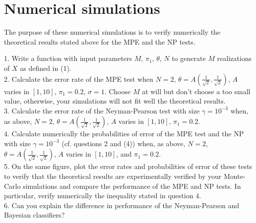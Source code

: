 \documentclass[12pt,a4paper]{article}
\begin{document}
\section{Numerical simulations}
The purpose of these numerical simulations is to verify numerically the theoretical results stated above for the MPE and the NP tests.\\
\begin{tquesto}{}{}
	1. Write a function with input parameters $M$, $\pi_1$, $\theta$, $N$ to generate $M$ realizations of $X$ as defined in (1).\\
	2. Calculate the error rate of the MPE test when $N = 2$, $\theta = A\left(\frac{1}{\sqrt{2}},\frac{1}{\sqrt{2}}\right)$, $A$ varies in $[1, 10]$, $\pi_1 = 0.2$, $\sigma = 1$. Choose $M$ at will but don't choose a too small value, otherwise, your simulations will not fit well the theoretical results.\\
	3. Calculate the error rate of the Neyman-Pearson test with size $\gamma = 10^{-3}$ when, as above, $N = 2$, $\theta = A\left(\frac{1}{\sqrt{2}},\frac{1}{\sqrt{2}}\right)$, $A$ varies in $[1, 10]$, $\pi_1 = 0.2$.\\
	4. Calculate numerically the probabilities of error of the MPE test and the NP with size $\gamma = 10^{-3}$ (cf. questions 2 and (4)) when, as above, $N = 2$, $\theta = A\left(\frac{1}{\sqrt{2}},\frac{1}{\sqrt{2}}\right)$, $A$ varies in $[1, 10]$, and $\pi_1 = 0.2$.\\
	5. On the same figure, plot the error rates and probabilities of error of these tests to verify that the theoretical results are experimentally verified by your Monte-Carlo simulations and compare the performance of the MPE and NP tests. In particular, verify numerically the inequality stated in question 4.\\
	6. Can you explain the difference in performance of the Neyman-Pearson and Bayesian classifiers?
\end{tquesto}
\end{document}
